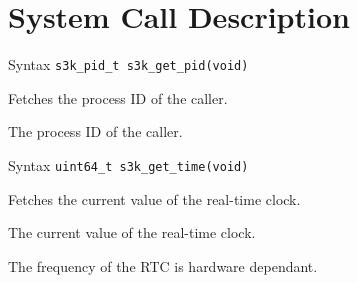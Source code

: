 \documentclass[a4paper,11pt]{article}
\newcommand{\syscall}[1]{\texttt{#1}}
\newenvironment{syscalldoc}[1]{
  \begin{tcolorbox}[breakable,title=\subsection{\syscall{#1}}]
  \begin{description}[leftmargin=!,style=nextline,noitemsep]
}{
  \end{description}
  \end{tcolorbox}
}
\begin{document}

\newpage
\section{System Call Description}

\begin{syscalldoc}{s3k\_get\_pid}
  \item[Syntax] \lstinline{s3k_pid_t s3k_get_pid(void)}
  \item[Description] Fetches the process ID of the caller.
  \item[Returns] The process ID of the caller.
\end{syscalldoc}

\begin{syscalldoc}{s3k\_get\_time}
  \item[Syntax] \lstinline{uint64_t s3k_get_time(void)}
  \item[Description] Fetches the current value of the real-time clock.
  \item[Returns] The current value of the real-time clock.
  \item[Notes] The frequency of the RTC is hardware dependant.
\end{syscalldoc}
\end{document}
